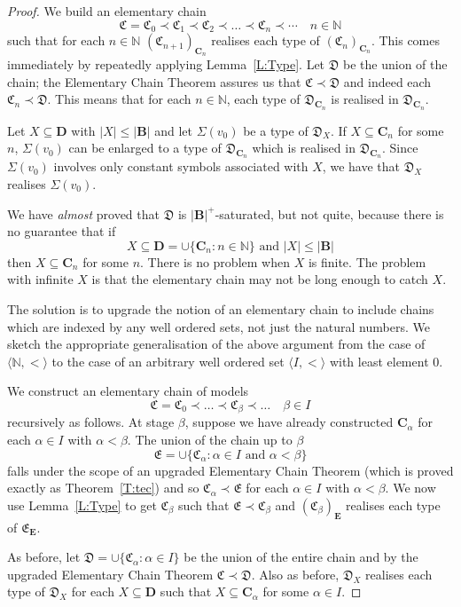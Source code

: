 \documentclass[titlepage, oneside]{amsbook}
\theoremstyle{plain}
\theoremstyle{definition}
\theoremstyle{remark}
\newcommand{\seq}{\ensuremath{\subseteq}}
\newcommand{\mc}{\ensuremath{\mathfrak{C}}}
\newcommand{\md}{\ensuremath{\mathfrak{D}}}
\newcommand{\me}{\ensuremath{\mathfrak{E}}}
\newcommand{\bb}{\ensuremath{\mathbf{B}}}
\newcommand{\bc}{\ensuremath{\mathbf{C}}}
\newcommand{\bd}{\ensuremath{\mathbf{D}}}
\newcommand{\be}{\ensuremath{\mathbf{E}}}
\newcommand{\nat}{\ensuremath{\mathbb{N}}}
\begin{document}
\begin{proof}  We build an elementary chain \[ \mc = \mc_0 \prec \mc_1
\prec \mc_2 \prec \dots \prec \mc_n \prec \cdots \quad n \in \nat \]
such that for each $n \in \nat$ $(\mc_{n+1})_{\bc_n}$ realises each
type of $(\mc_n)_{\bc_n}$.  This comes immediately by repeatedly
applying Lemma~\ref{L:Type}.  Let $\md$ be the union of the chain; the
Elementary Chain Theorem assures us that $\mc \prec \md$ and indeed
each $\mc_n \prec \md$. This means that for each $n \in \mathbb{N}$, 
each type of $\md_{\bc_{n}}$ is realised in $\md_{\bc_{n}}$.

Let $X \seq \bd$ with $|X| \leq |\bb|$ and let $\Sigma ( v_0 )$ be a
type of $\md_X$.  If $X \seq \bc_n$ for some $n$, $\Sigma (v_0)$ can be 
enlarged to a type of $\md_{\bc_n}$ which is realised in $\md_{\bc_n}$.
Since $\Sigma ( v_0 )$ involves only constant symbols associated with
$X$, we have that $\md_X$ realises $\Sigma ( v_0 )$. 

We have \emph{almost} proved that $\md$ is $|\bb|^+$-saturated, but not
quite, because there is no guarantee that if \[ X \seq \bd = \cup \{
\bc_n : n \in \nat \} \mbox{\ \ and \ } |X| \leq |\bb | \]
then $X \seq \bc_n$ 
for some $n$.  There is no problem when $X$ is finite.  The problem with infinite $X$ is that the
elementary chain may not be long enough to catch $X$.

The solution is to upgrade the notion of an elementary chain to include
chains which are indexed by any well ordered sets, not just the natural
numbers.  We sketch the appropriate generalisation of the above
argument from the case of $\langle \nat , \pmb{<} \rangle$ to the case
of an arbitrary well ordered set $\langle I , < \rangle$ with least
element $0$. 

We construct an elementary chain of models \[ \mc = \mc_0 \prec \dots
\prec \mc_\beta \prec \dots \quad \beta \in I \] recursively as
follows.  At stage $\beta$, suppose we have already constructed
$\bc_\alpha$ for each $\alpha \in I$ with $\alpha < \beta$.  The union
of the chain up to $\beta$ \[ \me = \cup \{ \mc_\alpha : \alpha \in I
\mbox{ and } \alpha < \beta \} \] falls under the scope of an upgraded
Elementary Chain Theorem (which is proved exactly as
Theorem~\ref{T:tec})
and so $\mc_\alpha \prec \me$ for each $\alpha \in I$ with $\alpha <
\beta$. We now use Lemma~\ref{L:Type} to get $\mc_\beta$ such
that $\me \prec \mc_\beta$ and $(\mc_\beta )_\be$ realises each type of
$\me_\be$.

As before, let $\md = \cup \{ \mc_\alpha : \alpha \in I \}$ be the
union of the entire chain and by the upgraded Elementary Chain Theorem
$\mc \prec \md$.  Also as before, $\md_X$ realises each type of $\md_X$
for each $X \seq \bd$ such that $X \seq \bc_\alpha$ for some $\alpha
\in I$.  


\end{proof}
\end{document}
